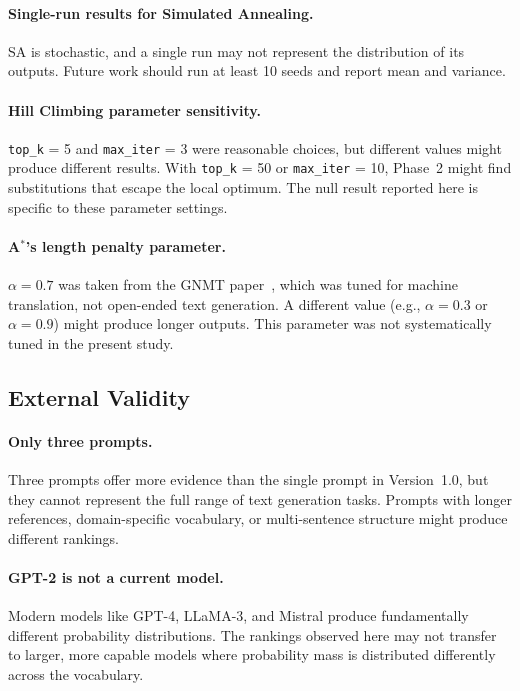 \documentclass[12pt]{article}
\begin{document}
	\paragraph{Single-run results for Simulated Annealing.}
	SA is stochastic, and a single run may not represent the distribution of its outputs. Future work should run at least 10 seeds and report mean and variance.
	
	\paragraph{Hill Climbing parameter sensitivity.}
	\texttt{top\_k} = 5 and \texttt{max\_iter} = 3 were reasonable choices, but different values might produce different results. With \texttt{top\_k} = 50 or \texttt{max\_iter} = 10, Phase~2 might find substitutions that escape the local optimum. The null result reported here is specific to these parameter settings.
	
	\paragraph{A$^*$'s length penalty parameter.}
	$\alpha = 0.7$ was taken from the GNMT paper~\cite{wu2016gnmt}, which was tuned for machine translation, not open-ended text generation. A different value (e.g., $\alpha = 0.3$ or $\alpha = 0.9$) might produce longer outputs. This parameter was not systematically tuned in the present study.
	
	\subsection{External Validity}
	
	\paragraph{Only three prompts.}
	Three prompts offer more evidence than the single prompt in Version~1.0, but they cannot represent the full range of text generation tasks. Prompts with longer references, domain-specific vocabulary, or multi-sentence structure might produce different rankings.
	
	\paragraph{GPT-2 is not a current model.}
	Modern models like GPT-4, LLaMA-3, and Mistral produce fundamentally different probability distributions. The rankings observed here may not transfer to larger, more capable models where probability mass is distributed differently across the vocabulary.
	
\end{document}
